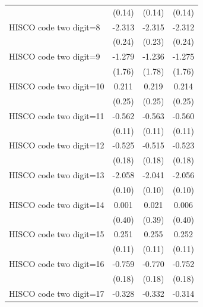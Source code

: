 {\begin{tabular}{l*{3}{c}}
                    &      (0.14)         &      (0.14)         &      (0.14)         \\
HISCO code two digit=8&      -2.313\sym{***}&      -2.315\sym{***}&      -2.312\sym{***}\\
                    &      (0.24)         &      (0.23)         &      (0.24)         \\
HISCO code two digit=9&      -1.279         &      -1.236         &      -1.275         \\
                    &      (1.76)         &      (1.78)         &      (1.76)         \\
HISCO code two digit=10&       0.211         &       0.219         &       0.214         \\
                    &      (0.25)         &      (0.25)         &      (0.25)         \\
HISCO code two digit=11&      -0.562\sym{***}&      -0.563\sym{***}&      -0.560\sym{***}\\
                    &      (0.11)         &      (0.11)         &      (0.11)         \\
HISCO code two digit=12&      -0.525\sym{***}&      -0.515\sym{***}&      -0.523\sym{***}\\
                    &      (0.18)         &      (0.18)         &      (0.18)         \\
HISCO code two digit=13&      -2.058\sym{***}&      -2.041\sym{***}&      -2.056\sym{***}\\
                    &      (0.10)         &      (0.10)         &      (0.10)         \\
HISCO code two digit=14&       0.001         &       0.021         &       0.006         \\
                    &      (0.40)         &      (0.39)         &      (0.40)         \\
HISCO code two digit=15&       0.251\sym{**} &       0.255\sym{**} &       0.252\sym{**} \\
                    &      (0.11)         &      (0.11)         &      (0.11)         \\
HISCO code two digit=16&      -0.759\sym{***}&      -0.770\sym{***}&      -0.752\sym{***}\\
                    &      (0.18)         &      (0.18)         &      (0.18)         \\
HISCO code two digit=17&      -0.328         &      -0.332         &      -0.314         \\

\end{tabular}}

